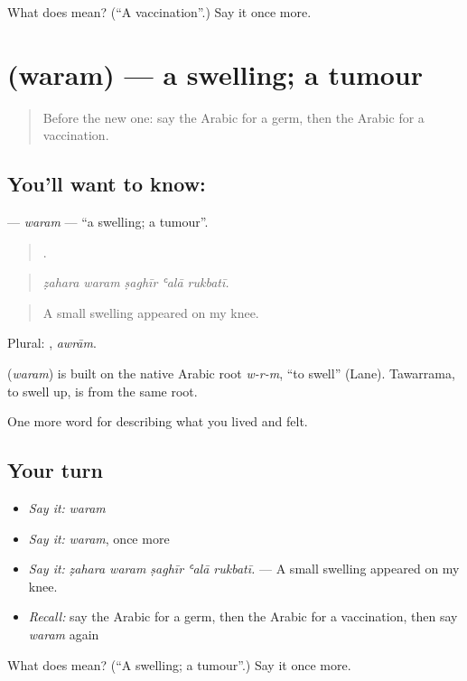 \begin{tcolorbox}[breakable,colback=teal!4,colframe=teal!35!black,title={Before you move on}]
What does  mean? (\textquotedblleft{}A vaccination\textquotedblright{}.) Say it once more.
\end{tcolorbox}
\section[\texorpdfstring{\ar{ورم} (waram)}{ورم (waram)}]{ (waram) — a swelling; a tumour}

\label{lesson:AR-C509-waram}



\begin{quote}
Before the new one: say the Arabic for a germ, then the Arabic for a vaccination.
\end{quote}

\subsection*{You'll want to know: }
\textbf{} — \emph{waram} — \textquotedblleft{}a swelling; a tumour\textquotedblright{}.

\begin{quote}
    .
\end{quote}

\begin{quote}
\emph{ẓahara waram ṣaghīr ʿalā rukbatī.}
\end{quote}

\begin{quote}
A small swelling appeared on my knee.
\end{quote}

Plural: , \emph{awrām}.

\begin{cousinweb}
\textbf{} (\emph{waram}) is built on the native Arabic root \emph{w-r-m}, \textquotedblleft{}to swell\textquotedblright{} (Lane). Tawarrama, to swell up, is from the same root.
\end{cousinweb}

\begin{grammarlens}[title={What you've built}]
One more word for describing what you lived and felt.
\end{grammarlens}

\subsection*{Your turn}
\begin{itemize}
\raggedright
  \item \emph{Say it:} \emph{waram}
  \item \emph{Say it:} \emph{waram}, once more
  \item \emph{Say it:} \emph{ẓahara waram ṣaghīr ʿalā rukbatī.} — A small swelling appeared on my knee.
  \item \emph{Recall:} say the Arabic for a germ, then the Arabic for a vaccination, then say \emph{waram} again
\end{itemize}

\begin{tcolorbox}[breakable,colback=teal!4,colframe=teal!35!black,title={Before you move on}]
What does  mean? (\textquotedblleft{}A swelling; a tumour\textquotedblright{}.) Say it once more.
\end{tcolorbox}
